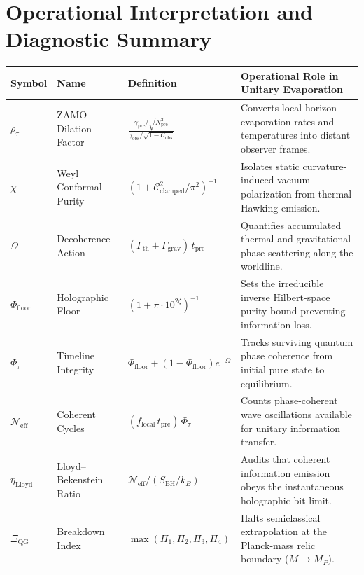 \documentclass[11pt,a4paper]{article}
\begin{document}
\section{Operational Interpretation and Diagnostic Summary}

\begin{table}[h!]
\centering
\small
\begin{tabularx}{\textwidth}{@{}l l l X@{}}
\toprule
\textbf{Symbol} & \textbf{Name} & \textbf{Definition} & \textbf{Operational Role in Unitary Evaporation} \\
\midrule
$\rho_\tau$ & ZAMO Dilation Factor & $\frac{\gamma_{\text{pre}}/\sqrt{N^2_{\text{pre}}}}{\gamma_{\text{obs}}/\sqrt{1-\mathcal{C}_{\text{obs}}}}$ & Converts local horizon evaporation rates and temperatures into distant observer frames. \\
$\chi$ & Weyl Conformal Purity & $(1 + \mathcal{C}_{\text{clamped}}^2 / \pi^2)^{-1}$ & Isolates static curvature-induced vacuum polarization from thermal Hawking emission. \\
$\Omega$ & Decoherence Action & $(\Gamma_{\text{th}} + \Gamma_{\text{grav}})\,t_{\text{pre}}$ & Quantifies accumulated thermal and gravitational phase scattering along the worldline. \\
$\Phi_{\text{floor}}$ & Holographic Floor & $(1 + \pi \cdot 10^{2\zeta})^{-1}$ & Sets the irreducible inverse Hilbert-space purity bound preventing information loss. \\
$\Phi_\tau$ & Timeline Integrity & $\Phi_{\text{floor}} + (1 - \Phi_{\text{floor}})e^{-\Omega}$ & Tracks surviving quantum phase coherence from initial pure state to equilibrium. \\
$\mathcal{N}_{\text{eff}}$ & Coherent Cycles & $(f_{\text{local}}\,t_{\text{pre}})\,\Phi_\tau$ & Counts phase-coherent wave oscillations available for unitary information transfer. \\
$\eta_{\text{Lloyd}}$ & Lloyd--Bekenstein Ratio & $\mathcal{N}_{\text{eff}} / (S_{\text{BH}} / k_B)$ & Audits that coherent information emission obeys the instantaneous holographic bit limit. \\
$\Xi_{\text{QG}}$ & Breakdown Index & $\max(\Pi_1, \Pi_2, \Pi_3, \Pi_4)$ & Halts semiclassical extrapolation at the Planck-mass relic boundary ($M \to M_P$). \\
\bottomrule
\end{tabularx}
\end{table}
\end{document}
